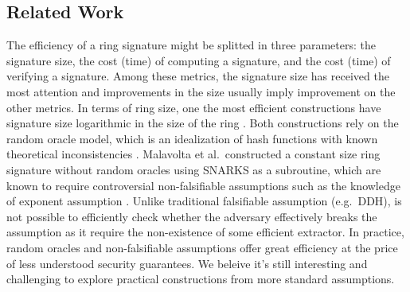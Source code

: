 \subsection{Related Work}
The efficiency of a ring signature might be splitted in three parameters: the signature size, the cost (time) of computing a signature, and the cost (time) of verifying a signature. Among these metrics, the signature size has received the most attention and improvements in the size usually imply improvement on the other metrics.
In terms of ring size, one the most efficient constructions have signature size logarithmic in the size of the ring \cite{EC:GroKoh15,EC:LLNW16}. Both constructions rely on the {random oracle model}, which is an idealization of hash functions with known theoretical inconsistencies \cite{FOCS:GolKal03}. Malavolta et al.~constructed a constant size ring signature without random oracles \cite{AC:MalSch17} using SNARKS \cite{EC:GGPR13,AC:DFGK14,EC:Groth16} as a subroutine, which are known to require controversial non-falsifiable assumptions such as the knowledge of exponent assumption  \cite{STOC:GenWic11,C:Naor03}. Unlike traditional falsifiable assumption (e.g.~DDH), is not possible to efficiently check whether the adversary effectively breaks the assumption as it require the non-existence of some efficient extractor. In practice, random oracles and non-falsifiable assumptions offer great efficiency at the price of less understood security guarantees. We beleive it's still interesting and challenging to explore practical constructions from more standard assumptions.

